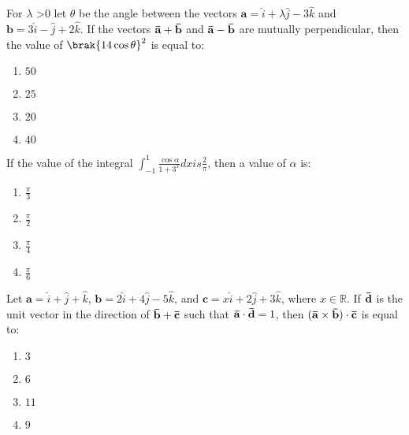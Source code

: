 \iffalse
\title{2024}
\author{AI24BTECH11006}
\section{mcq-single}
\fi
\item For $\lambda$ \textgreater $ 0$ let $\theta$ be the angle between the vectors $\mathbf{a} = \hat{i} + \lambda \hat{j} - 3 \hat{k}$ and $\mathbf{b} = 3 \hat{i} - \hat{j} + 2 \hat{k}$. If the vectors $\mathbf{\Bar{a}} + \mathbf{\Bar{b}}$ and $\mathbf{\Bar{a}} - \mathbf{\Bar{b}}$ are mutually perpendicular, then the value of $\brak{14 \cos \theta}^2$ is equal to:
    \hfill{}
	\begin{enumerate}
        \item $50$
        \item $25$
        \item $20$
        \item $40$
    \end{enumerate}

    \item If the value of the integral $\int_{-1}^{1} \frac{\cos \alpha}{1 + 3^x}dx is \frac{2}{\pi}$, then a value of $\alpha$ is:
    \hfill{}
	    \begin{enumerate}
        \item $\frac{\pi}{3}$
        \item $\frac{\pi}{2}$
        \item $\frac{\pi}{4}$
        \item $\frac{\pi}{6}$
    \end{enumerate}

    \item Let $\mathbf{a} = \hat{i} + \hat{j} + \hat{k}$, $\mathbf{b} = 2 \hat{i} + 4 \hat{j} - 5 \hat{k}$, and $\mathbf{c} = x \hat{i} + 2 \hat{j} + 3 \hat{k}$, where $x \in \mathbb{R}$. If $\mathbf{\Bar{d}}$ is the unit vector in the direction of $\mathbf{\Bar{b}} + \mathbf{\Bar{c}}$ such that $\mathbf{\Bar{a}} \cdot \mathbf{\Bar{d}} = 1$, then $(\mathbf{\Bar{a}} \times \mathbf{\Bar{b}}) \cdot \mathbf{\Bar{c}}$ is equal to:
    \hfill{}
	    \begin{enumerate}
        \item $3$
        \item $6$
        \item $11$
        \item $9$
    \end{enumerate}


